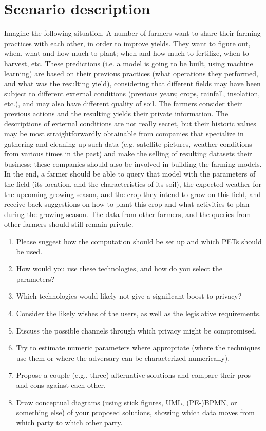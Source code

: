 
\newpage


\section{Scenario description}
Imagine the following situation. A number of farmers want to share their farming practices with each other, in order to improve yields. They want to figure out, when, what and how much to plant; when and how much to fertilize, when to harvest, etc. These predictions (i.e. a model is going to be built, using machine learning) are based on their previous practices (what operations they performed, and what was the resulting yield), considering that different fields may have been subject to different external conditions (previous years; crops, rainfall, insolation, etc.), and may also have different quality of soil. The farmers consider their previous actions and the resulting yields their private information. The descriptions of external conditions are not really secret, but their historic values may be most straightforwardly obtainable from companies that specialize in gathering and cleaning up such data (e.g. satellite pictures, weather conditions from various times in the past) and make the selling of resulting datasets their business; these companies should also be involved in building the farming models.
In the end, a farmer should be able to query that model with the parameters of the field (its location, and the characteristics of its soil), the expected weather for the upcoming growing season, and the crop they intend to grow on this field, and receive back suggestions on how to plant this crop and what activities to plan during the growing season. The data from other farmers, and the queries from other farmers should still remain private.


\begin{enumerate}
  \item Please suggest how the computation should be set up and which PETs should be used.
  \item How would you use these technologies, and how do you select the parameters?
  \item Which technologies would likely not give a significant boost to privacy?
  \item Consider the likely wishes of the users, as well as the legislative requirements.
  \item Discuss the possible channels through which privacy might be compromised.
  \item Try to estimate numeric parameters where appropriate (where the techniques use them or where the adversary can be characterized numerically).
  \item Propose a couple (e.g., three) alternative solutions and compare their pros and cons against each other.
  \item Draw conceptual diagrams (using stick figures, UML, (PE-)BPMN, or something else) of your proposed solutions, showing which data moves from which party to which other party.
\end{enumerate}


